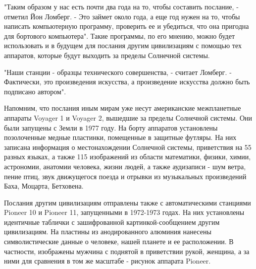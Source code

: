 "Таким образом у нас есть почти два года на то, чтобы составить послание, -
отметил Йон Ломберг. - Это займет около года, а еще год нужен на то, чтобы
написать компьютерную программу, проверить ее и убедиться, что она пригодна для
бортового компьютера". Такие программы, по его мнению, можно будет использовать
и в будущем для послания другим цивилизациям с помощью тех аппаратов, которые
будут выходить за пределы Солнечной системы.

"Наши станции - образцы технического совершенства, - считает Ломберг. -
Фактически, это произведения искусства, а произведение искусства должно быть
подписано автором". 

Напомним, что послания иным мирам уже несут американские межпланетные аппараты
Voyager 1 и Voyager 2, вышедшие за пределы Солнечной системы. Они были запущены
с Земли в 1977 году. На борту аппаратов установлены позолоченные медные
пластинки, помещенные в защитные футляры. На них записана информация о
местонахождении Солнечной системы, приветствия на 55 разных языках, а также 115
изображений из области математики, физики, химии, астрономии, анатомии
человека, жизни людей, а также аудизаписи - шум ветра, пение птиц, звук
движущегося поезда и отрывки из музыкальных произведений Баха, Моцарта,
Бетховена.

Послания другим цивилизациям отправлены также с автоматическими станциями
Pioneer 10 и Pioneer 11, запущенными в 1972-1973 годах. На них установлены
идентичные таблички с зашифрованной картинкой-сообщением другим цивилизациям.
На пластины из анодированного алюминия нанесены символистические данные о
человеке, нашей планете и ее расположении. В частности, изображены мужчина с
поднятой в приветствии рукой, женщина, а за ними для сравнения в том же
масштабе - рисунок аппарата Pioneer.
